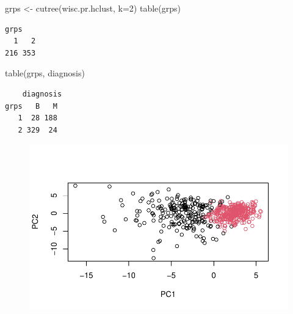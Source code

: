 \documentclass[
  letterpaper,
  DIV=11,
  numbers=noendperiod]{scrartcl}
\newenvironment{Shaded}{\begin{snugshade}}{\end{snugshade}}
\newcommand{\AttributeTok}[1]{\textcolor[rgb]{0.40,0.45,0.13}{#1}}
\newcommand{\DecValTok}[1]{\textcolor[rgb]{0.68,0.00,0.00}{#1}}
\newcommand{\FunctionTok}[1]{\textcolor[rgb]{0.28,0.35,0.67}{#1}}
\newcommand{\NormalTok}[1]{\textcolor[rgb]{0.00,0.23,0.31}{#1}}
\newcommand{\OtherTok}[1]{\textcolor[rgb]{0.00,0.23,0.31}{#1}}
\newcommand{\SpecialCharTok}[1]{\textcolor[rgb]{0.37,0.37,0.37}{#1}}
\begin{document}
\begin{Shaded}
\begin{Highlighting}[]
\NormalTok{grps }\OtherTok{\textless{}{-}} \FunctionTok{cutree}\NormalTok{(wisc.pr.hclust, }\AttributeTok{k=}\DecValTok{2}\NormalTok{)}
\FunctionTok{table}\NormalTok{(grps)}
\end{Highlighting}
\end{Shaded}

\begin{verbatim}
grps
  1   2 
216 353 
\end{verbatim}

\begin{Shaded}
\begin{Highlighting}[]
\FunctionTok{table}\NormalTok{(grps, diagnosis)}
\end{Highlighting}
\end{Shaded}

\begin{verbatim}
    diagnosis
grps   B   M
   1  28 188
   2 329  24
\end{verbatim}

\begin{Shaded}
\end{Shaded}

\begin{figure}[H]

{\centering \includegraphics{test_files/figure-pdf/unnamed-chunk-22-1.pdf}

}

\end{figure}
\end{document}
